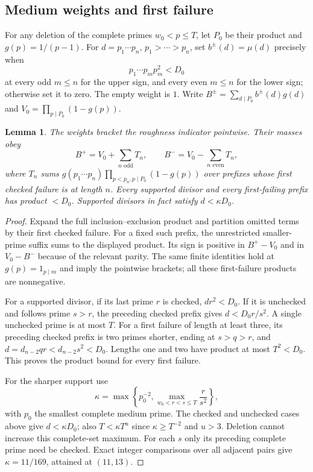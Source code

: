 \documentclass[11pt]{article}
\newtheorem{lemma}[theorem]{Lemma}
\theoremstyle{remark}\newtheorem{remark}[theorem]{Remark}
\begin{document}
\subsection{Medium weights and first failure}
For any deletion of the complete primes $w_0<p\le T$, let $P_0$ be
their product and $g(p)=1/(p-1)$. For $d=p_1\cdots p_n$,
$p_1>\cdots>p_n$, set $b^\pm(d)=\mu(d)$ precisely when
\[
p_1\cdots p_m p_m^2<D_0
\]
at every odd $m\le n$ for the upper sign, and every even $m\le n$
for the lower sign; otherwise set it to zero. The empty weight is $1$.
Write $B^\pm=\sum_{d\mid P_0}b^\pm(d)g(d)$ and
$V_0=\prod_{p\mid P_0}(1-g(p))$.
\begin{lemma}\label{lem:firstfailure}
The weights bracket the roughness indicator pointwise. Their masses obey
\[
B^+=V_0+\sum_{n\text{ odd}}T_n,\qquad
B^-=V_0-\sum_{n\text{ even}}T_n,
\]
where $T_n$ sums $g(p_1\cdots p_n)\prod_{p<p_n,p\mid P_0}(1-g(p))$
over prefixes whose first checked failure is at length $n$.
Every supported divisor and every first-failing prefix has product $<D_0$.
Supported divisors in fact satisfy $d<\kappa D_0$.
\end{lemma}
\begin{proof}
Expand the full inclusion--exclusion product and partition omitted terms
by their first checked failure. For a fixed such prefix, the unrestricted
smaller-prime suffix sums to the displayed product. Its sign is positive
in $B^+-V_0$ and in $V_0-B^-$ because of the relevant parity.
The same finite identities hold at $g(p)=1_{p\mid m}$ and imply the
pointwise brackets; all these first-failure products are nonnegative.

For a supported divisor, if its last prime $r$ is checked, $dr^2<D_0$.
If it is unchecked and follows prime $s>r$, the preceding checked
prefix gives $d<D_0r/s^2$. A single unchecked prime is at most $T$.
For a first failure of length at least three, its preceding checked
prefix is two primes shorter, ending at $s>q>r$, and
$d=d_{n-2}qr<d_{n-2}s^2<D_0$.
Lengths one and two have product at most $T^2<D_0$.
This proves the product bound for every first failure.

For the sharper support use
\[
\kappa=\max\left\{p_0^{-2},\max_{w_0<r<s\le T}\frac r{s^2}\right\},
\]
with $p_0$ the smallest complete medium prime.
The checked and unchecked cases above give $d<\kappa D_0$;
also $T<\kappa T^u$ since $\kappa\ge T^{-2}$ and $u>3$.
Deletion cannot increase this complete-set maximum. For each $s$ only
its preceding complete prime need be checked. Exact integer comparisons
over all adjacent pairs give $\kappa=11/169$, attained at $(11,13)$.
\end{proof}
\end{document}

